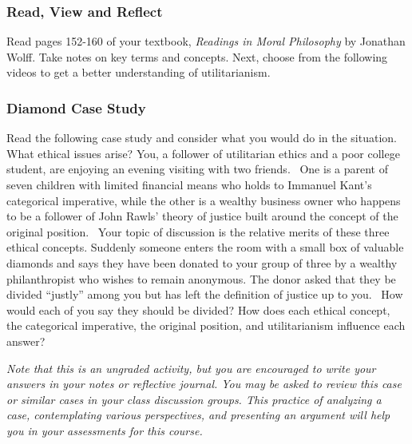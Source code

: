 \documentclass[
]{book}
\begin{document}
\begin{reflect}
\hypertarget{read-view-and-reflect-13}{%
\subsubsection{Read, View and Reflect}\label{read-view-and-reflect-13}}

Read pages 152-160 of your textbook, \emph{Readings in Moral Philosophy} by Jonathan
Wolff. Take notes on key terms and concepts.
Next, choose from the following videos to get a better understanding of
utilitarianism.

\hypertarget{diamond-case-study-1}{%
\subsubsection*{Diamond Case Study}\label{diamond-case-study-1}}

Read the following case study and consider what you would do in the situation.
What ethical issues arise?
You, a follower of utilitarian ethics and a poor college student, are enjoying an evening visiting with two friends. ~One is a parent of seven children with limited financial means who holds to Immanuel Kant's categorical imperative, while the other is a wealthy business owner who happens to be a follower of John Rawls' theory of justice built around the concept of the original position. ~Your topic of discussion is the relative merits of these three ethical concepts. Suddenly someone enters the room with a small box of valuable diamonds and says they have been donated to your group of three by a wealthy philanthropist who wishes to remain anonymous. The donor asked that they be divided ``justly'' among you but has left the definition of justice up to you. ~How would each of you say they should be divided? How does each ethical concept, the categorical imperative, the original position, and utilitarianism influence each answer?
\end{reflect}

\begin{caution}
\emph{Note that this is an ungraded activity, but you are encouraged to write your answers in your notes or reflective journal. You may be asked to review this case or similar cases in your class discussion groups. This practice of analyzing a case, contemplating various perspectives, and presenting an argument will help you in your assessments for this course.}
\end{caution}
\end{document}
